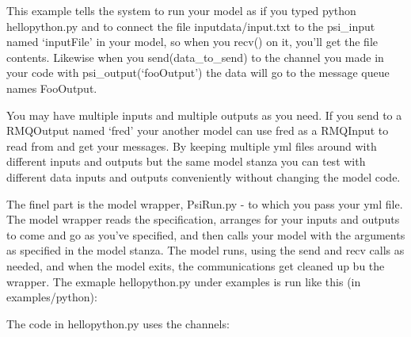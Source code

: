 \documentclass[letterpaper,10pt,english]{sphinxmanual}
\begin{document}
This example tells the system to run your model as if you typed \sphinxquotedblleft{}python
hellopython.py\sphinxquotedblright{} and to connect the file inputdata/input.txt to the
psi\_input named `inputFile' in your model, so when you recv() on it,
you'll get the file contents. Likewise when you send(data\_to\_send) to
the channel you made in your code with psi\_output(`fooOutput') the data
will go to the message queue names FooOutput.

You may have multiple inputs and multiple outputs as you need. If you
send to a RMQOutput named `fred' your another model can use fred as a
RMQInput to read from and get your messages. By keeping multiple yml
files around with different inputs and outputs but the same model stanza
you can test with different data inputs and outputs conveniently without
changing the model code.

The finel part is the model wrapper, PsiRun.py - to which you pass your
yml file. The model wrapper reads the specification, arranges for your
inputs and outputs to come and go as you've specified, and then calls
your model with the arguments as specified in the model stanza. The
model runs, using the send and recv calls as needed, and when the model
exits, the communications get cleaned up bu the wrapper. The exmaple
hellopython.py under examples is run like this (in examples/python):

\begin{sphinxVerbatim}[commandchars=\\\{\}]
  
\end{sphinxVerbatim}

The code in hellopython.py uses the channels:

\begin{sphinxVerbatim}[commandchars=\\\{\}]
  
  
  
  

  
  
\end{sphinxVerbatim}
\end{document}

